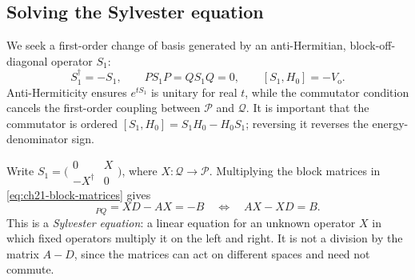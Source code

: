 \subsection{Solving the Sylvester equation}
\label{subsec:ch21-sylvester}

We seek a first-order change of basis generated by an anti-Hermitian,
block-off-diagonal operator $S_1$:
\begin{equation}
 S_1^\dagger=-S_1,\qquad PS_1P=QS_1Q=0,
 \qquad [S_1,H_0]=-V_{\mathrm o}.
\label{eq:ch21-generator-equation}
\end{equation}
Anti-Hermiticity ensures $e^{tS_1}$ is unitary for real $t$, while the
commutator condition cancels the first-order coupling between
$\mathcal P$ and $\mathcal Q$.  It is important that the commutator is
ordered $[S_1,H_0]=S_1H_0-H_0S_1$; reversing it reverses the
energy-denominator sign.

Write
$S_1=\bigl(\begin{smallmatrix}0&X\\-X^\dagger&0\end{smallmatrix}\bigr)$,
where $X:\mathcal Q\to\mathcal P$.  Multiplying the block matrices in
\eqref{eq:ch21-block-matrices} gives
\begin{equation}
 [S_1,H_0]_{PQ}=XD-AX=-B
 \quad\Longleftrightarrow\quad AX-XD=B.
\label{eq:ch21-sylvester}
\end{equation}
This is a \emph{Sylvester equation}: a linear equation for an unknown
operator $X$ in which fixed operators multiply it on the left and right.
It is not a division by the matrix $A-D$, since the matrices can act on
different spaces and need not commute.


